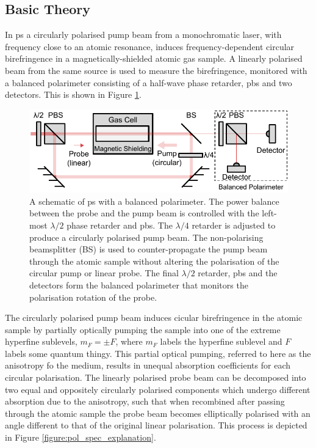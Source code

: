 \subsection{Basic Theory}

In \gls{ps} a circularly polarised pump beam from a monochromatic laser, with frequency close to an atomic resonance, induces frequency-dependent circular birefringence in a magnetically-shielded atomic gas sample.
A linearly polarised beam from the same source is used to measure the birefringence, monitored with a balanced polarimeter consisting of a half-wave phase retarder, \gls{pbs} and two detectors.
This is shown in Figure \ref{figure:pol_spec_schematic}.

\begin{figure}
\centering
\includegraphics[width=\linewidth]{chapter1/Figs/PolSpecSchematic.pdf}
\caption{A schematic of \gls{ps} with a balanced polarimeter.
The power balance between the probe and the pump beam is controlled with the left-most $\lambda/2$ phase retarder and \gls{pbs}.
The $\lambda/4$ retarder is adjusted to produce a circularly polarised pump beam.
The non-polarising beamsplitter (BS) is used to counter-propagate the pump beam through the atomic sample without altering the polarisation of the circular pump or linear probe.
The final $\lambda/2$ retarder, \gls{pbs} and the detectors form the balanced polarimeter that monitors the polarisation rotation of the probe.}
\label{figure:pol_spec_schematic}
\end{figure}

The circularly polarised pump beam induces cicular birefringence in the atomic sample by partially optically pumping the sample into one of the extreme hyperfine sublevels, $m_F=\pm F$, where $m_F$ labels the hyperfine sublevel and $F$ labels {\color{red}some quantum thingy.}
This partial optical pumping, referred to here as the anisotropy fo the medium, results in unequal absorption coefficients for each circular polarisation.
The linearly polarised probe beam can be decomposed into two equal and oppositely circularly polarised components which undergo different absorption due to the anisotropy, such that when recombined after passing through the atomic sample the probe beam becomes elliptically polarised with an angle different to that of the original linear polarisation.
This process is depicted in Figure \ref{figure:pol_spec_explanation}.

